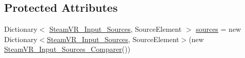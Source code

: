 \subsection*{Protected Attributes}
\begin{DoxyCompactItemize}
\item 
Dictionary$<$ \mbox{\hyperlink{namespace_valve_1_1_v_r_a82e5bf501cc3aa155444ee3f0662853f}{Steam\+V\+R\+\_\+\+Input\+\_\+\+Sources}}, Source\+Element $>$ \mbox{\hyperlink{class_valve_1_1_v_r_1_1_steam_v_r___action___source___map_a7a426e28fb44538575b06892049cd122}{sources}} = new Dictionary$<$\mbox{\hyperlink{namespace_valve_1_1_v_r_a82e5bf501cc3aa155444ee3f0662853f}{Steam\+V\+R\+\_\+\+Input\+\_\+\+Sources}}, Source\+Element$>$(new \mbox{\hyperlink{struct_valve_1_1_v_r_1_1_steam_v_r___input___sources___comparer}{Steam\+V\+R\+\_\+\+Input\+\_\+\+Sources\+\_\+\+Comparer}}())
\end{DoxyCompactItemize}
